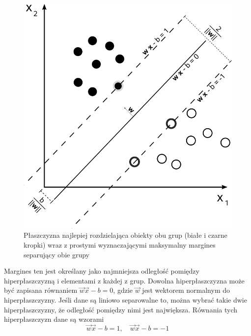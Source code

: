 \documentclass[
]{book}
\theoremstyle{plain}
\theoremstyle{definition}
\theoremstyle{definition}
\theoremstyle{definition}
\theoremstyle{definition}
\theoremstyle{definition}
\theoremstyle{remark}
\begin{document}
\begin{figure}

{\centering \includegraphics[width=11.11in]{images/Svm_max_sep_hyperplane_with_margin} 

}

\caption{Płaszczyzna najlepiej rozdzielająca obiekty obu grup (białe i czarne kropki) wraz z prostymi wyznaczającymi maksymalny margines separujący obie grupy}\label{fig:svm2}
\end{figure}

Margines ten jest określany jako najmniejsza odległość pomiędzy hiperpłaszczyzną i elementami z każdej z grup. Dowolna hiperpłaszczyzna może być zapisana równaniem \(\vec{w}\vec{x}-b=0\), gdzie \(\vec{w}\) jest wektorem normalnym do hiperpłaszczyzny. Jeśli dane są liniowo separowalne to, można wybrać takie dwie hiperpłaszczyzny, że odległość pomiędzy nimi jest największa. Równania tych hiperpłaszczyzn dane są wzorami
\begin{equation}
    \vec{w}\vec{x}-b=1, \quad \vec{w}\vec{x}-b=-1
    \label{eq:hiper1}
\end{equation}
\end{document}
